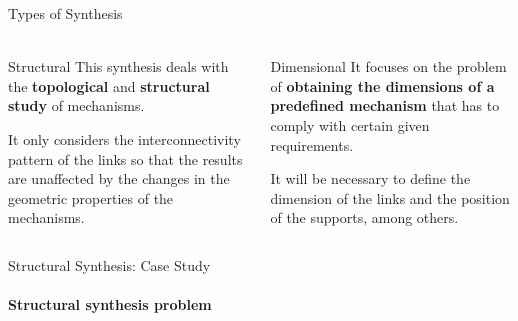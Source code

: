 \documentclass[aspectratio=169]{beamer}
\begin{document}
\begin{frame}[t]{Types of Synthesis}
\framesubtitle{}
\begin{columns}[T,onlytextwidth]
    \begin{column}{0.45\textwidth}
        \begin{exampleblock}{Structural}
            This synthesis deals with the \textbf{topological} and \textbf{structural study} of mechanisms. \smallskip
            
            It only considers the interconnectivity pattern of the links so that the results are unaffected by the changes in the geometric properties of the mechanisms.
        \end{exampleblock}
    \end{column}
    \begin{column}{0.45\textwidth}
        \begin{exampleblock}{Dimensional}
            It focuses on the problem of \textbf{obtaining the dimensions of a predefined mechanism} that has to comply with certain given requirements. \smallskip
            
            It will be necessary to deﬁne the dimension of the links and the position of the supports, among others.
        \end{exampleblock}
    \end{column}
\end{columns}
\end{frame}

\begin{frame}[t]{Structural Synthesis: Case Study}
    \framesubtitle{Structural synthesis problem}
\end{frame}
\end{document}
